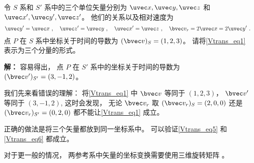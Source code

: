 \begin{example}{}\label{Vtrans_ex2}
令 $S$ 系和 $S'$ 系中的三个单位矢量分别为 $\uvec x, \uvec y, \uvec z$ 和 $\uvec x', \uvec y', \uvec z'$。 他们的关系以及相对速度为
\begin{equation}
\uvec y' = \uvec x~, \quad
\uvec z' = \uvec y~, \quad
\uvec x' = \uvec z~, \quad
\bvec v_r = 2\uvec x = 2\uvec y'~.
\end{equation}
点 $P$ 在 $S$ 系中坐标关于时间的导数为 $(\bvec v)_S = (1, 2, 3)$。 请将\autoref{Vtrans_eq1} 表示为三个分量的形式。

\textbf{解：} 容易得出， 点 $P$ 在 $S'$ 系中的坐标关于时间的导数为 $(\bvec v')_{S'} = (3, -1, 2)$。

我们先来看错误的理解： 将\autoref{Vtrans_eq1} 中 $\bvec v$ 等同于 $(1, 2, 3)$， $\bvec v'$ 等同于 $(3, -1, 2)$,  这时会发现， 无论 $\bvec v_r$ 取 $(\bvec v_r)_S = (2, 0, 0)$ 还是 $(\bvec v_r)_{S'} = (0, 2, 0)$ 都不能让\autoref{Vtrans_eq1} 成立。

正确的做法是将三个矢量都放到同一坐标系中。 可以验证\autoref{Vtrans_eq5} 和\autoref{Vtrans_eq6} 都成立。

对于更一般的情况， 两参考系中矢量的坐标变换需要使用三维旋转矩阵 。
\end{example}
